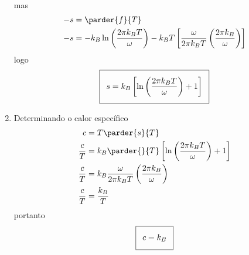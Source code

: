 \begin{prob}
\begin{sol}
\begin{enumerate}[label=\alph *)]
\begin{align}
\begin{split}
        \end{split}
      \end{align}
      mas
      \begin{align}
        \begin{split}
          -s&=\parder{f}{T}\\
          -s&=-k_B\ln\left(\frac{2\pi k_BT}{\omega}\right)-k_BT\left[\frac{\omega}{2\pi k_BT}\left(\frac{2\pi k_B}{\omega}\right)\right]          
        \end{split}
      \end{align}
      logo
      \begin{align}
        \addtolength{\fboxsep}{5pt}
        \boxed{
          \begin{gathered}
            s=k_B\left[\ln\left(\frac{2\pi k_BT}{\omega}\right)+1\right]
          \end{gathered}
        }
      \end{align}
      \item Determinando o calor específico
      \begin{align}
        \begin{split}
          c&=T\parder{s}{T}\\
          \frac{c}{T}&=k_B\parder{}{T}\left[\ln\left(\frac{2\pi k_BT}{\omega}\right)+1\right]\\
          \frac{c}{T}&=k_B\frac{\omega}{2\pi k_BT}\left(\frac{2\pi k_B}{\omega}\right)\\
          \frac{c}{T}&=\frac{k_B}{T}
        \end{split}
      \end{align}
      portanto
      \begin{align}
        \addtolength{\fboxsep}{5pt}
        \boxed{
          \begin{gathered}
            c=k_B
          \end{gathered}
        }
      \end{align}
    \end{enumerate}
  \end{sol}
\end{prob}
